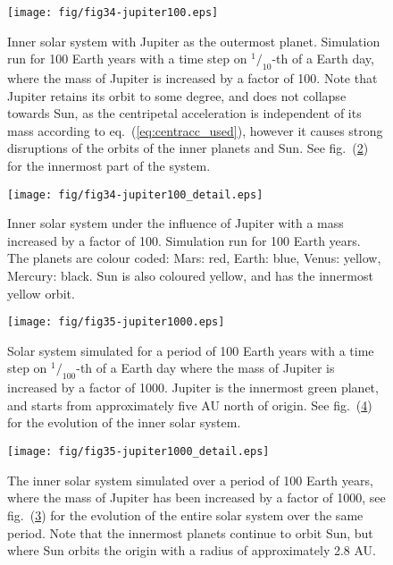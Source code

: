 \documentclass[a4paper,11pt]{article}
\begin{document}
\begin{figure}[htb]
    \centering
    \texttt{[image: fig/fig34-jupiter100.eps]}
    \caption{Inner solar system with Jupiter as the outermost planet. Simulation run for 100 Earth years with a time step on $^1\!/_{10}$-th of a Earth day, where the mass of Jupiter is increased by a factor of 100. Note that Jupiter retains its orbit to some degree, and does not collapse towards Sun, as the centripetal acceleration is independent of its mass according to eq.~(\ref{eq:centracc_used}), however it causes strong disruptions of the orbits of the inner planets and Sun. See fig.~(\ref{fig:34b}) for the innermost part of the system.}
    \label{fig:34}
\end{figure}

\begin{figure}[htb]
    \centering
    \texttt{[image: fig/fig34-jupiter100\_detail.eps]}
    \caption{Inner solar system under the influence of Jupiter with a mass increased by a factor of 100. Simulation run for 100 Earth years. The planets are colour coded: Mars: red, Earth: blue, Venus: yellow, Mercury: black. Sun is also coloured yellow, and has the innermost yellow orbit.}
    \label{fig:34b}
\end{figure}

\begin{figure}[hbt]
    \centering
    \texttt{[image: fig/fig35-jupiter1000.eps]}
    \caption{Solar system simulated for a period of 100 Earth years with a time step on $^1\!/_{100}$-th of a Earth day where the mass of Jupiter is increased by a factor of 1000. Jupiter is the innermost green planet, and starts from approximately five AU north of origin. See fig.~(\ref{fig:35b}) for the evolution of the inner solar system.}
    \label{fig:35}
\end{figure}

\begin{figure}[htb]
    \centering
    \texttt{[image: fig/fig35-jupiter1000\_detail.eps]}
    \caption{The inner solar system simulated over a period of 100 Earth years, where the mass of Jupiter has been increased by a factor of 1000, see fig.~(\ref{fig:35}) for the evolution of the entire solar system over the same period. Note that the innermost planets continue to orbit Sun, but where Sun orbits the origin with a radius of approximately 2.8 AU.}
    \label{fig:35b}
\end{figure}
\end{document}
